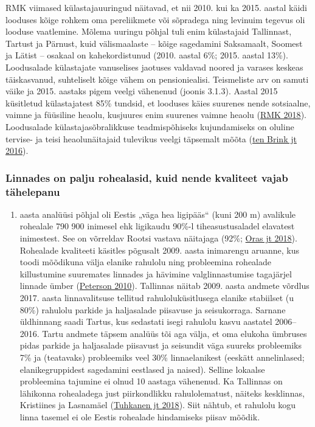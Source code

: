 \documentclass[estonian,]{article}
\providecommand{\tightlist}{%
  \setlength{\itemsep}{0pt}\setlength{\parskip}{0pt}}
\begin{document}
RMK viimased külastajauuringud näitavad, et nii 2010. kui ka 2015. aastal käidi looduses kõige rohkem oma pereliikmete või sõpradega ning levinuim tegevus oli looduse vaatlemine. Mõlema uuringu põhjal tuli enim külastajaid Tallinnast, Tartust ja Pärnust, kuid välismaalaste -- kõige sagedamini Saksamaalt, Soomest ja Lätist -- osakaal on kahekordistunud (2010. aastal 6\%; 2015. aastal 13\%). Loodusalade külastajate vanuselises jaotuses valdavad noored ja varases keskeas täiskasvanud, suhteliselt kõige vähem on pensioniealisi. Teismeliste arv on samuti väike ja 2015. aastaks pigem veelgi vähenenud (joonis 3.1.3). Aastal 2015 küsitletud külastajatest 85\% tundsid, et looduses käies suurenes nende sotsiaalne, vaimne ja füüsiline heaolu, kusjuures enim suurenes vaimne heaolu (\protect\hyperlink{RMK2018}{RMK 2018}). Loodusalade külastajasõbralikkuse teadmispõhiseks kujundamiseks on oluline tervise- ja teisi heaolunäitajaid tulevikus veelgi täpsemalt mõõta (\protect\hyperlink{ten2016}{ten Brink jt 2016}).

\hypertarget{linnades-on-palju-rohealasid-kuid-nende-kvaliteet-vajab-tuxe4helepanu}{%
\subsubsection*{Linnades on palju rohealasid, kuid nende kvaliteet vajab tähelepanu}\label{linnades-on-palju-rohealasid-kuid-nende-kvaliteet-vajab-tuxe4helepanu}}

\begin{enumerate}
\def\labelenumi{\arabic{enumi}.}
\setcounter{enumi}{2016}
\tightlist
\item
  aasta analüüsi põhjal oli Eestis „väga hea ligipääs`` (kuni 200 m) avalikule rohealale 790 900 inimesel ehk ligikaudu 90\%-l tiheasustusaladel elavatest inimestest. See on võrreldav Rootsi vastava näitajaga (92\%; \protect\hyperlink{Oras2018}{Oras jt 2018}). Rohealade kvaliteeti käsitles põgusalt 2009. aasta inimarengu aruanne, kus toodi mõõdikuna välja elanike rahulolu ning probleemina rohealade killustumine suuremates linnades ja hävimine valglinnastumise tagajärjel linnade ümber (\protect\hyperlink{Peterson2010}{Peterson 2010}). Tallinnas näitab 2009. aasta andmete võrdlus 2017. aasta linnavalitsuse tellitud rahuloluküsitlusega elanike stabiilset (u 80\%) rahulolu parkide ja haljasalade piisavuse ja seisukorraga. Sarnane üldhinnang saadi Tartus, kus sedastati isegi rahulolu kasvu aastatel 2006--2016. Tartu andmete täpsem analüüs tõi aga välja, et oma elukoha ümbruses pidas parkide ja haljasalade piisavust ja seisundit väga suureks probleemiks 7\% ja (teatavaks) probleemiks veel 30\% linnaelanikest (eeskätt annelinlased; elanikegruppidest sagedamini eestlased ja naised). Selline lokaalse probleemina tajumine ei olnud 10 aastaga vähenenud. Ka Tallinnas on lähikonna rohealadega just piirkondlikku rahulolematust, näiteks kesklinnas, Kristiines ja Lasnamäel (\protect\hyperlink{Tuhkanen2018}{Tuhkanen jt 2018}). Siit nähtub, et rahulolu kogu linna tasemel ei ole Eestis rohealade hindamiseks piisav mõõdik.
\end{enumerate}
\end{document}
